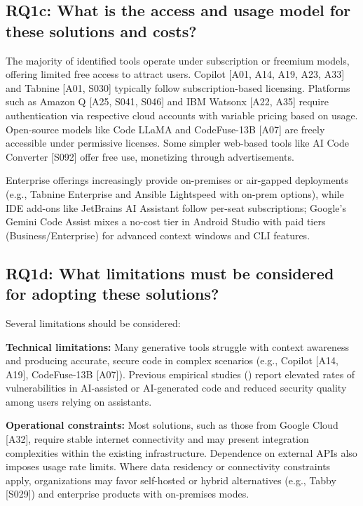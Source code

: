 \subsection{RQ1c: What is the access and usage model for these solutions and costs?}

The majority of identified tools operate under subscription or freemium models, offering limited free access to attract users. Copilot [A01, A14, A19, A23, A33] and Tabnine [A01, S030] typically follow subscription-based licensing. Platforms such as Amazon Q [A25, S041, S046] and IBM Watsonx [A22, A35] require authentication via respective cloud accounts with variable pricing based on usage. Open-source models like Code LLaMA and CodeFuse-13B [A07] are freely accessible under permissive licenses. Some simpler web-based tools like AI Code Converter [S092] offer free use, monetizing through advertisements.

Enterprise offerings increasingly provide on-premises or air-gapped deployments (e.g., Tabnine Enterprise and Ansible Lightspeed with on-prem options), while IDE add-ons like JetBrains AI Assistant follow per-seat subscriptions; Google’s Gemini Code Assist mixes a no-cost tier in Android Studio with paid tiers (Business/Enterprise) for advanced context windows and CLI features.


\subsection{RQ1d: What limitations must be considered for adopting these solutions?}

Several limitations should be considered:

\textbf{Technical limitations:} Many generative tools struggle with context awareness and producing accurate, secure code in complex scenarios (e.g., Copilot [A14, A19], CodeFuse-13B [A07]). Previous empirical studies (\cite{perry2023users, ji2024cybersecurity}) report elevated rates of vulnerabilities in AI-assisted or AI-generated code and reduced security quality among users relying on assistants.

\textbf{Operational constraints:} Most solutions, such as those from Google Cloud [A32], require stable internet connectivity and may present integration complexities within the existing infrastructure. Dependence on external APIs also imposes usage rate limits. Where data residency or connectivity constraints apply, organizations may favor self-hosted or hybrid alternatives (e.g., Tabby [S029]) and enterprise products with on-premises modes.

